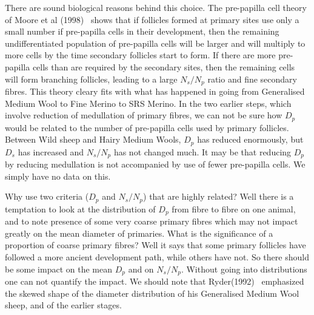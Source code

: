 \documentclass[titlepage]{article}  %
\begin{document}
There are sound biological reasons behind this choice. The pre-papilla cell theory of Moore et al (1998)~\cite{moor:98} shows that if follicles formed at primary sites use only a small number if pre-papilla cells in their development, then the remaining undifferentiated population of pre-papilla cells will be larger and will multiply to more cells by the time secondary follicles start to form. If there are more pre-papilla cells than are required by the secondary sites, then the remaining cells will form branching follicles, leading to a large $N_{s}/N_{p}$ ratio and fine secondary fibres.  This theory cleary fits with what has happened in going from Generalised Medium Wool to Fine Merino to SRS Merino. In the two earlier steps, which involve reduction of medullation of primary fibres, we can not be sure how $D_{p}$ would be related to the number of pre-papilla cells used by primary follicles. Between Wild sheep and Hairy Medium Wools, $D_{p}$ has reduced enormously, but $D_{s}$ has increased and $N_{s}/N_{p}$ has not changed much. It may be that reducing $D_{p}$ by reducing medullation is not accompanied by use of fewer pre-papilla cells. We simply have no data on this.

Why use two criteria ($D_{p}$ and $N_{s}/N_{p}$) that are highly related?  Well there is a temptation to look at the distribution of $D_{p}$ from fibre to fibre on one animal, and to note presence of some very coarse primary fibres which may not impact greatly on the mean diameter of primaries. What is the significance of a proportion of coarse primary fibres? Well it says that some primary follicles have followed a more ancient development path, while others have not. So there should be some impact on the mean $D_{p}$ and on $N_{s}/N_{p}$. Without going into distributions one can not quantify the impact. We should note that Ryder(1992)~\cite{ryde:92} emphasized the skewed shape of the diameter distribution of his Generalised Medium Wool sheep, and of the earlier stages. 
\end{document}
